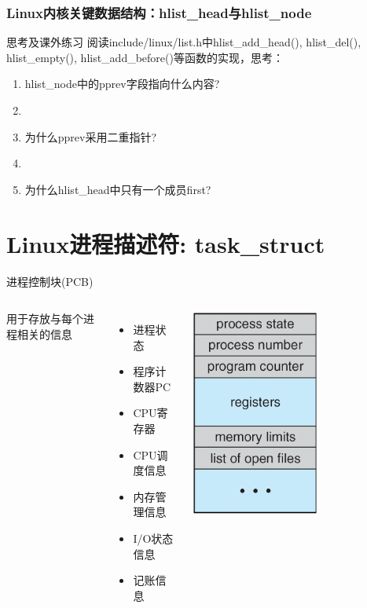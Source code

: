 \documentclass[xcolor=svgnames]{beamer}
\begin{document}
\begin{CJK*}{UTF8}{gbsn}
\begin{frame}%
\frametitle{Linux内核关键数据结构：hlist\_head与hlist\_node}
\begin{block}{思考及课外练习}
阅读include/linux/list.h中\alert{hlist\_add\_head}(), \alert{hlist\_del}(), \alert{hlist\_empty}(),
\alert{hlist\_add\_before}()等函数的实现，思考：

\begin{enumerate}
\item hlist\_node中的pprev字段指向什么内容?
\item[]
\item 为什么pprev采用二重指针?
\item[]
\item 为什么hlist\_head中只有一个成员first?
\end{enumerate}
\end{block}
\end{frame}

\section{Linux进程描述符: task\_struct}

\begin{frame}{进程控制块(PCB)}
\begin{columns}%
用于存放与每个进程相关的信息
\begin{itemize}
\item 进程状态
\item 程序计数器PC
\item CPU寄存器
\item CPU调度信息
\item 内存管理信息
\item I/O状态信息
\item 记账信息
\end{itemize}
\includegraphics[width=0.6\textwidth]{PCB.png}
\end{columns}%
\end{frame}


\end{CJK*}
\end{document}
